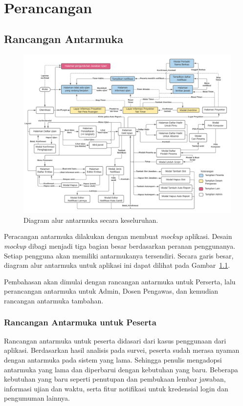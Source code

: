 \chapter{Perancangan}
\label{chap:perancangan}

\section{Rancangan Antarmuka}
    \begin{figure}
        \centering
        \includegraphics[height=0.7\paperwidth]{Gambar/Screenflow - Plumber.pdf}
        \caption{Diagram alur antarmuka secara keseluruhan.}
        \label{fig:screenflow-overview}
    \end{figure}

    Peracangan antarmuka dilakukan dengan membuat \textit{mockup} aplikasi.
    Desain \textit{mockup} dibagi menjadi tiga bagian besar berdasarkan peranan
    penggunanya. Setiap pengguna akan memiliki antarmukanya tersendiri. Secara
    garis besar, diagram alur antarmuka untuk aplikasi ini dapat dilihat pada
    Gambar~\ref{fig:screenflow-overview}.
    
    Pembahasan akan dimulai dengan rancangan antarmuka untuk Perserta, lalu
    perancangan antarmuka untuk Admin, Dosen Pengawas, dan kemudian rancangan
    antarmuka tambahan.

\subsection{Rancangan Antarmuka untuk Peserta}
    Rancangan antarmuka untuk peserta didasari dari kasus penggunaan dari
    aplikasi. Berdasarkan hasil analisis pada survei, peserta sudah merasa
    nyaman dengan antarmuka pada sistem yang lama. Sehingga penulis mengadopsi
    antarmuka yang lama dan diperbarui dengan kebutuhan yang baru. Beberapa
    kebutuhan yang baru seperti penutupan dan pembukaan lembar jawaban,
    informasi ujian dan waktu, serta fitur notifikasi untuk kredensial login dan
    pengumuman lainnya.
    
